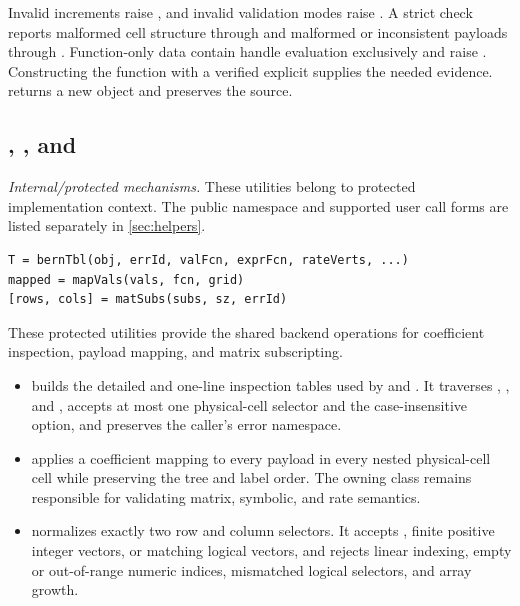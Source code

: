\remarkshead
Invalid increments raise , and invalid validation modes raise . A strict check reports malformed cell structure through  and malformed or inconsistent payloads through . Function-only  data contain handle evaluation exclusively and raise . Constructing the function with a verified explicit  supplies the needed evidence.  returns a new object and preserves the source.

\subsection{\texorpdfstring{, , and }{bernTbl, mapVals, and matSubs}}
\label{sec:pdbase-backend-utilities}

\textit{Internal/protected mechanisms.} These utilities belong to  protected implementation context. The public  namespace and supported user call forms are listed separately in \cref{sec:helpers}.

\syntaxhead
\begin{lstlisting}[style=dpsyntax]
T = bernTbl(obj, errId, valFcn, exprFcn, rateVerts, ...)
mapped = mapVals(vals, fcn, grid)
[rows, cols] = matSubs(subs, sz, errId)
\end{lstlisting}

\descriptionhead
These protected utilities provide the shared backend operations for coefficient inspection, payload mapping, and matrix subscripting.
\begin{itemize}[leftmargin=*]
    \item {} builds the detailed and one-line inspection tables used by  and . It traverses , , and , accepts at most one physical-cell selector and the case-insensitive  option, and preserves the caller's error namespace.
    \item {} applies a coefficient mapping to every payload in every nested physical-cell cell while preserving the tree and label order. The owning class remains responsible for validating matrix, symbolic, and rate semantics.
    \item {} normalizes exactly two row and column selectors. It accepts \code{:}, finite positive integer vectors, or matching logical vectors, and rejects linear indexing, empty or out-of-range numeric indices, mismatched logical selectors, and array growth.
\end{itemize}

